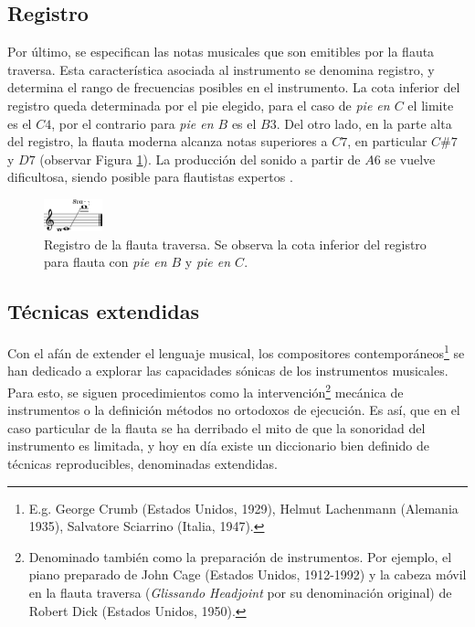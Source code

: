 \documentclass
  [ams,pdfout]%
	{aeslac}
\begin{document}
\subsection*{Registro}

Por último, se especifican las notas musicales que son emitibles por la flauta traversa. Esta característica asociada al instrumento se denomina registro, y determina el rango de frecuencias posibles en el instrumento. La cota inferior del registro queda determinada por el pie elegido, para el caso de \textit{pie en $C$} el limite es el $C4$, por el contrario para \textit{pie en $B$} es el $B3$. Del otro lado, en la parte alta del registro, la flauta moderna alcanza notas superiores a $C7$, en particular $C\#7$ y $D7$ (observar Figura \ref{fig:registro_flauta}). La producción del sonido a partir de $A6$ se vuelve dificultosa, siendo posible para flautistas expertos \cite{samuel2002study}.

\begin{figure}[h!]
\begin{center}
\includegraphics[width=0.15\textwidth]{imagenes/registro_flauta} 
\caption{Registro de la flauta traversa. Se observa la cota inferior del registro para flauta con \textit{pie en $B$} y \textit{pie en $C$}.}
\label{fig:registro_flauta}
\end{center}
\end{figure} 


\subsection{Técnicas extendidas}

Con el afán de extender el lenguaje musical, los compositores contemporáneos\footnote{E.g. George Crumb (Estados Unidos, 1929), Helmut Lachenmann (Alemania 1935), Salvatore Sciarrino (Italia, 1947).} se han dedicado a explorar las capacidades sónicas de los instrumentos musicales. Para esto, se siguen procedimientos como la intervención\footnote{Denominado también como la preparación de instrumentos. Por ejemplo, el piano preparado de John Cage (Estados Unidos, 1912-1992) y la cabeza móvil en la flauta traversa (\textit{Glissando Headjoint} por su denominación original) de Robert Dick (Estados Unidos, 1950).} mecánica de instrumentos o la definición métodos no ortodoxos de ejecución. Es así, que en el caso particular de la flauta se ha derribado el mito de que la sonoridad del instrumento es limitada, y hoy en día existe un diccionario bien definido de técnicas reproducibles, denominadas extendidas\cite{dick1975other}.
\end{document}
